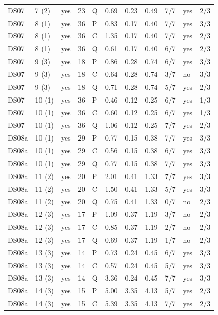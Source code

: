 \documentclass[10pt]{article}
\begin{document}
{\begin{longtable}{lllrlrrrrlr}
DS07 & 7 (2) & yes & 23 & Q & 0.69 & 0.23 & 0.49 & 7/7 & yes & 2/3 \\
DS07 & 8 (1) & yes & 36 & P & 0.83 & 0.17 & 0.40 & 7/7 & yes & 3/3 \\
DS07 & 8 (1) & yes & 36 & C & 1.35 & 0.17 & 0.40 & 7/7 & yes & 2/3 \\
DS07 & 8 (1) & yes & 36 & Q & 0.61 & 0.17 & 0.40 & 6/7 & yes & 2/3 \\
DS07 & 9 (3) & yes & 18 & P & 0.86 & 0.28 & 0.74 & 6/7 & yes & 3/3 \\
DS07 & 9 (3) & yes & 18 & C & 0.64 & 0.28 & 0.74 & 3/7 & no & 3/3 \\
DS07 & 9 (3) & yes & 18 & Q & 0.71 & 0.28 & 0.74 & 5/7 & yes & 2/3 \\
DS07 & 10 (1) & yes & 36 & P & 0.46 & 0.12 & 0.25 & 6/7 & yes & 1/3 \\
DS07 & 10 (1) & yes & 36 & C & 0.60 & 0.12 & 0.25 & 6/7 & yes & 1/3 \\
DS07 & 10 (1) & yes & 36 & Q & 1.06 & 0.12 & 0.25 & 7/7 & yes & 2/3 \\
\midrule
DS08a & 10 (1) & yes & 29 & P & 0.77 & 0.15 & 0.38 & 7/7 & yes & 3/3 \\
DS08a & 10 (1) & yes & 29 & C & 0.56 & 0.15 & 0.38 & 6/7 & yes & 3/3 \\
DS08a & 10 (1) & yes & 29 & Q & 0.77 & 0.15 & 0.38 & 7/7 & yes & 3/3 \\
DS08a & 11 (2) & yes & 20 & P & 2.01 & 0.41 & 1.33 & 7/7 & yes & 3/3 \\
DS08a & 11 (2) & yes & 20 & C & 1.50 & 0.41 & 1.33 & 5/7 & yes & 3/3 \\
DS08a & 11 (2) & yes & 20 & Q & 0.75 & 0.41 & 1.33 & 0/7 & no & 2/3 \\
DS08a & 12 (3) & yes & 17 & P & 1.09 & 0.37 & 1.19 & 3/7 & no & 2/3 \\
DS08a & 12 (3) & yes & 17 & C & 0.85 & 0.37 & 1.19 & 2/7 & no & 2/3 \\
DS08a & 12 (3) & yes & 17 & Q & 0.69 & 0.37 & 1.19 & 1/7 & no & 2/3 \\
DS08a & 13 (3) & yes & 14 & P & 0.73 & 0.24 & 0.45 & 6/7 & yes & 3/3 \\
DS08a & 13 (3) & yes & 14 & C & 0.57 & 0.24 & 0.45 & 5/7 & yes & 3/3 \\
DS08a & 13 (3) & yes & 14 & Q & 3.36 & 0.24 & 0.45 & 7/7 & yes & 3/3 \\
DS08a & 14 (3) & yes & 15 & P & 5.00 & 3.35 & 4.13 & 5/7 & yes & 2/3 \\
DS08a & 14 (3) & yes & 15 & C & 5.39 & 3.35 & 4.13 & 7/7 & yes & 2/3 \\

\end{longtable}}
\end{document}
